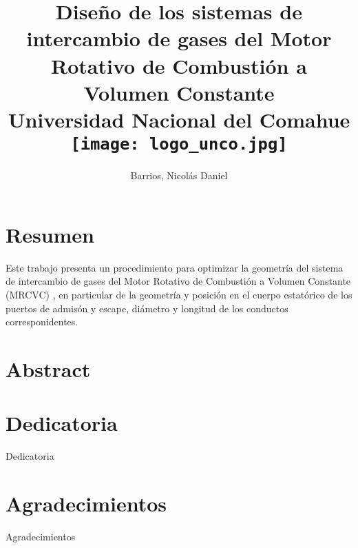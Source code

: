 \documentclass[11pt,openright,twoside]{report}
\begin{document}
\title{
    {Diseño de los sistemas de intercambio de gases del Motor Rotativo de
    Combustión a Volumen Constante
    }\\

{\large Universidad Nacional del Comahue}\\
{\texttt{[image: logo\_unco.jpg]}}
}
\author{Barrios, Nicolás Daniel}
\date{}\maketitle

\section*{Resumen}

Este trabajo presenta un procedimiento para optimizar la geometría
del sistema de intercambio de gases del Motor Rotativo de Combustión a
Volumen Constante (MRCVC) \cite{toth}, en particular de la geometría y
posición en el cuerpo estatórico de los puertos de admisón y escape,
diámetro y longitud de los conductos corresponidentes.

\section*{Abstract}

\section*{Dedicatoria}
Dedicatoria

\section*{Agradecimientos}
Agradecimientos

\tableofcontents









\printbibliography
\end{document}
